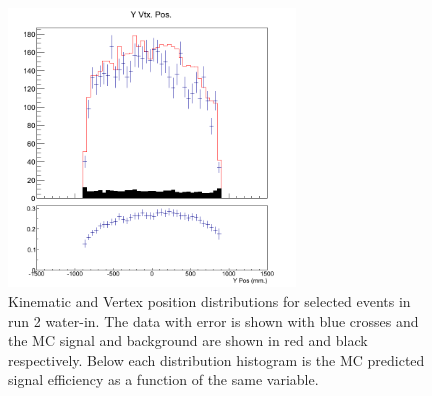 \begin{figure}[h]
\includegraphics[width=3in]{Figures/TN100Plots/c_Ywater_2.png}
\caption{Kinematic and Vertex position distributions for selected events in run 2 water-in.  The data with error is shown with blue crosses and the MC signal and background are shown in red and black respectively. Below each distribution histogram is the MC predicted signal efficiency as a function of the same variable.}
\label{fig:xs1run2water}
\end{figure}

